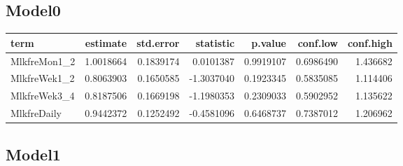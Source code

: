 \documentclass[
]{article}
\newenvironment{Shaded}{\begin{snugshade}}{\end{snugshade}}
\newcommand{\DataTypeTok}[1]{\textcolor[rgb]{0.13,0.29,0.53}{#1}}
\newcommand{\KeywordTok}[1]{\textcolor[rgb]{0.13,0.29,0.53}{\textbf{#1}}}
\newcommand{\NormalTok}[1]{#1}
\newcommand{\OperatorTok}[1]{\textcolor[rgb]{0.81,0.36,0.00}{\textbf{#1}}}
\newcommand{\OtherTok}[1]{\textcolor[rgb]{0.56,0.35,0.01}{#1}}
\newcommand{\StringTok}[1]{\textcolor[rgb]{0.31,0.60,0.02}{#1}}
\begin{document}
\hypertarget{model0-3}{%
\subsection{Model0}\label{model0-3}}

\begin{Shaded}
\end{Shaded}

\begin{longtable}[]{@{}lrrrrrr@{}}
\toprule
term & estimate & std.error & statistic & p.value & conf.low &
conf.high\tabularnewline
\midrule
\endhead
MlkfreMon1\_2 & 1.0018664 & 0.1839174 & 0.0101387 & 0.9919107 &
0.6986490 & 1.436682\tabularnewline
MlkfreWek1\_2 & 0.8063903 & 0.1650585 & -1.3037040 & 0.1923345 &
0.5835085 & 1.114406\tabularnewline
MlkfreWek3\_4 & 0.8187506 & 0.1669198 & -1.1980353 & 0.2309033 &
0.5902952 & 1.135622\tabularnewline
MlkfreDaily & 0.9442372 & 0.1252492 & -0.4581096 & 0.6468737 & 0.7387012
& 1.206962\tabularnewline
\bottomrule
\end{longtable}

\hypertarget{model1-3}{%
\subsection{Model1}\label{model1-3}}

\begin{Shaded}
\end{Shaded}
\end{document}
